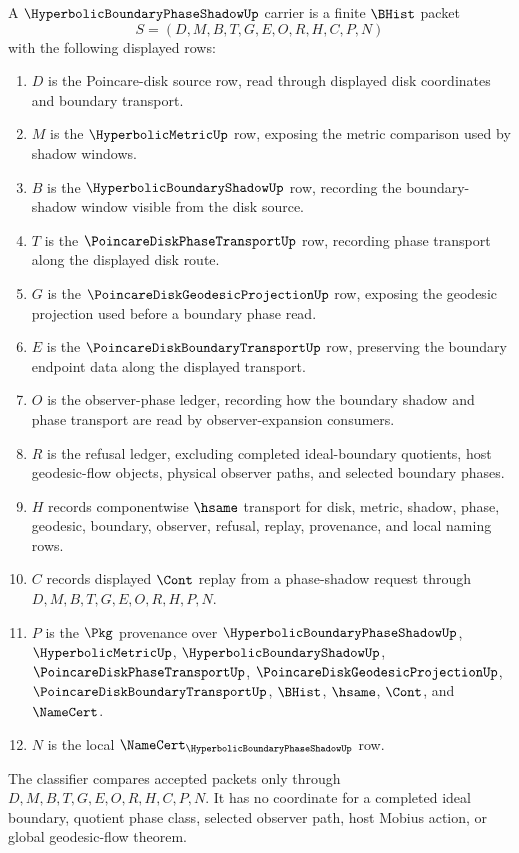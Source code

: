 \begin{definition}
\label{def:hyperbolic-boundary-phase-shadow-carrier}
A $\HyperbolicBoundaryPhaseShadowUp$ carrier is a finite $\BHist$ packet
$$
S=(D,M,B,T,G,E,O,R,H,C,P,N)
$$
with the following displayed rows:
\begin{enumerate}
\item $D$ is the Poincare-disk source row, read through displayed disk coordinates and boundary transport.
\item $M$ is the $\HyperbolicMetricUp$ row, exposing the metric comparison used by shadow windows.
\item $B$ is the $\HyperbolicBoundaryShadowUp$ row, recording the boundary-shadow window visible from the disk source.
\item $T$ is the $\PoincareDiskPhaseTransportUp$ row, recording phase transport along the displayed disk route.
\item $G$ is the $\PoincareDiskGeodesicProjectionUp$ row, exposing the geodesic projection used before a boundary phase read.
\item $E$ is the $\PoincareDiskBoundaryTransportUp$ row, preserving the boundary endpoint data along the displayed transport.
\item $O$ is the observer-phase ledger, recording how the boundary shadow and phase transport are read by observer-expansion consumers.
\item $R$ is the refusal ledger, excluding completed ideal-boundary quotients, host geodesic-flow objects, physical observer paths, and selected boundary phases.
\item $H$ records componentwise $\hsame$ transport for disk, metric, shadow, phase, geodesic, boundary, observer, refusal, replay, provenance, and local naming rows.
\item $C$ records displayed $\Cont$ replay from a phase-shadow request through $D,M,B,T,G,E,O,R,H,P,N$.
\item $P$ is the $\Pkg$ provenance over $\HyperbolicBoundaryPhaseShadowUp$, $\HyperbolicMetricUp$, $\HyperbolicBoundaryShadowUp$, $\PoincareDiskPhaseTransportUp$, $\PoincareDiskGeodesicProjectionUp$, $\PoincareDiskBoundaryTransportUp$, $\BHist$, $\hsame$, $\Cont$, and $\NameCert$.
\item $N$ is the local $\NameCert_{\HyperbolicBoundaryPhaseShadowUp}$ row.
\end{enumerate}
The classifier compares accepted packets only through $D,M,B,T,G,E,O,R,H,C,P,N$. It has no coordinate for a completed ideal boundary, quotient phase class, selected observer path, host Mobius action, or global geodesic-flow theorem.
\end{definition}

